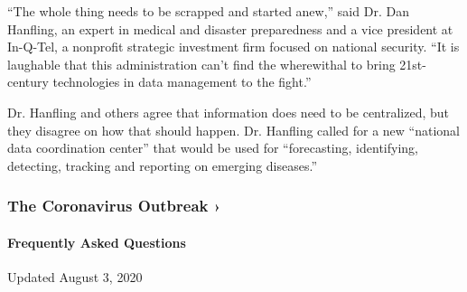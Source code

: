 ``The whole thing needs to be scrapped and started anew,'' said Dr. Dan
Hanfling, an expert in medical and disaster preparedness and a vice
president at In-Q-Tel, a nonprofit strategic investment firm focused on
national security. ``It is laughable that this administration can't find
the wherewithal to bring 21st-century technologies in data management to
the fight.''

Dr. Hanfling and others agree that information does need to be
centralized, but they disagree on how that should happen. Dr. Hanfling
called for a new ``national data coordination center'' that would be
used for ``forecasting, identifying, detecting, tracking and reporting
on emerging diseases.''

\href{https://www.nytimes.com/news-event/coronavirus?action=click\&pgtype=Article\&state=default\&region=MAIN_CONTENT_3\&context=storylines_faq}{}

\hypertarget{the-coronavirus-outbreak-}{%
\subsubsection{The Coronavirus Outbreak
›}\label{the-coronavirus-outbreak-}}

\hypertarget{frequently-asked-questions}{%
\paragraph{Frequently Asked
Questions}\label{frequently-asked-questions}}

Updated August 3, 2020

